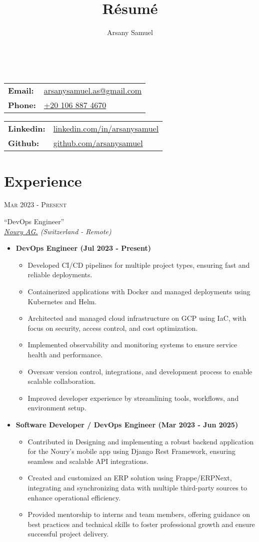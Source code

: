 \documentclass[a4paper]{article}
\title{R\'esum\'e}
\author{Arsany Samuel}
\makeatletter
\renewcommand{\maketitle}{
	\begin{center}
		{\Huge\bfseries{\theauthor}}\\
			\vspace{0.5em}
		{
			\begin{center}
                \begin{minipage}{0.4\linewidth}
                    \large\begin{tabular}{l  l}
                        \textbf{Email:} & \href{mailto:arsanysamuel.as@gmail.com}{arsanysamuel.as@gmail.com}  \\ 
                        \textbf{Phone:} & \href{tel:+201068874670}{+20 106 887 4670}  \\
                    \end{tabular}
                \end{minipage}
                \hspace{1em}
                \begin{minipage}{0.4\linewidth}
                    \large\begin{tabular}{l  l}
                        \textbf{Linkedin:} & \href{https://linkedin.com/in/arsanysamuel}{linkedin.com/in/arsanysamuel}  \\
                        \textbf{Github:} & \href{https://github.com/arsanysamuel}{github.com/arsanysamuel}
                    \end{tabular}
                \end{minipage}
			\end{center}
		}
	\end{center}
}
\newcommand{\entry}[4]{   %
	\begin{center}
		\begin{minipage}[c]{0.2\linewidth}  %
			\vfill
			\hfill  %
			\textsc{#1}  %
			\vfill
		\end{minipage}
		\hfill\vline\hfill  %
		\begin{minipage}[c]{0.75\linewidth}
			\textrm{``#2''} \\
			\textit{#3} \\
			\footnotesize{#4}
		\end{minipage}
	\end{center}
}
\newcommand{\blist}[1]{  %
    \vspace{-\topsep}
    \renewcommand\labelitemi{\tiny$\bullet$}
    \begin{itemize}[leftmargin=3.5mm, noitemsep]
        #1
    \end{itemize}
}
\newcommand{\sblist}[1]{  %
    \vspace{-\topsep}
    \renewcommand\labelitemii{\textopenbullet}
    \begin{itemize}[leftmargin=5mm, noitemsep]
        #1
    \end{itemize}
}
\makeatother
\begin{document}
	\maketitle

	\section{Experience}
        \entry{Mar 2023 - Present}
            {DevOps Engineer}
            {\href{https://www.noury.ch/}{Noury AG.} (Switzerland - Remote)}
            {
                \blist{
                    \item \textbf{DevOps Engineer (Jul 2023 - Present)}
                    \sblist{
                        \item{Developed CI/CD pipelines for multiple project types, ensuring fast and reliable deployments.}
                        \item{Containerized applications with Docker and managed deployments using Kubernetes and Helm.}
                        \item{Architected and managed cloud infrastructure on GCP using IaC, with focus on security, access control, and cost optimization.}
                        \item{Implemented observability and monitoring systems to ensure service health and performance.}
                        \item{Oversaw version control, integrations, and development process to enable scalable collaboration.}
                        \item{Improved developer experience by streamlining tools, workflows, and environment setup.}
                    }
                    \item \textbf{Software Developer / DevOps Engineer (Mar 2023 - Jun 2025)}
                    \sblist{
                        \item{Contributed in Designing and implementing a robust backend application for the Noury’s mobile app using Django Rest Framework,
                            ensuring seamless and scalable API integrations.}
                        \item{Created and customized an ERP solution using Frappe/ERPNext,
                            integrating and synchronizing data with multiple third-party sources to enhance operational efficiency.}
                        \item{Provided mentorship to interns and team members,
                            offering guidance on best practices and technical skills to foster professional growth and ensure successful project delivery.}
                    }
                }
            }
\end{document}
